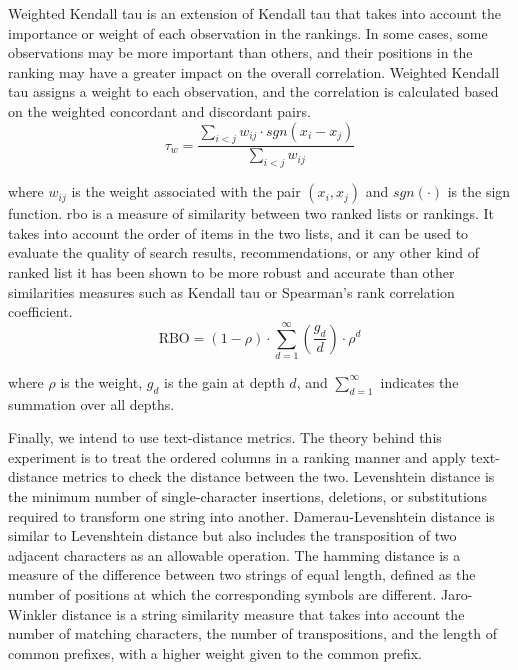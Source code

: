 Weighted Kendall tau  \cite{vignaWeightedCorrelationIndex2015} is an extension of Kendall tau that takes into account the importance or weight of each observation in the rankings. In some cases, some observations may be more important than others, and their positions in the ranking may have a greater impact on the overall correlation. Weighted Kendall tau assigns a weight to each observation, and the correlation is calculated based on the weighted concordant and discordant pairs.
\begin{equation}
\tau_w = \frac{{\sum_{i<j} w_{ij} \cdot sgn(x_i - x_j)}}{{\sum_{i<j} w_{ij}}}
\end{equation}

where $w_{ij}$ is the weight associated with the pair $(x_i, x_j)$ and $sgn(\cdot)$ is the sign function.
\ac{rbo} \cite{webberSimilarityMeasureIndefinite2010} is a measure of similarity between two ranked lists or rankings. It takes into account the order of items in the two lists, and it can be used to evaluate the quality of search results, recommendations, or any other kind of ranked list it has been shown to be more robust and accurate than other similarities measures such as Kendall tau or Spearman's rank correlation coefficient. 
\begin{equation}
\text{{RBO}} = (1 - \rho) \cdot \sum_{d=1}^{\infty} \left( \frac{{g_d}}{{d}} \right) \cdot \rho^d
\end{equation}

where $\rho$ is the weight, $g_d$ is the gain at depth $d$, and $\sum_{d=1}^{\infty}$ indicates the summation over all depths.


Finally, we intend to use text-distance metrics. The theory behind this experiment is to treat the ordered columns in a ranking manner and apply text-distance metrics to check the distance between the two. Levenshtein distance \cite{navarroGuidedTourApproximate2001} is the minimum number of single-character insertions, deletions, or substitutions required to transform one string into another. Damerau-Levenshtein distance \cite{navarroGuidedTourApproximate2001} is similar to Levenshtein distance but also includes the transposition of two adjacent characters as an allowable operation. The hamming distance \cite{6772729} is a measure of the difference between two strings of equal length, defined as the number of positions at which the corresponding symbols are different. Jaro-Winkler distance \cite{navarroGuidedTourApproximate2001} is a string similarity measure that takes into account the number of matching characters, the number of transpositions, and the length of common prefixes, with a higher weight given to the common prefix.




